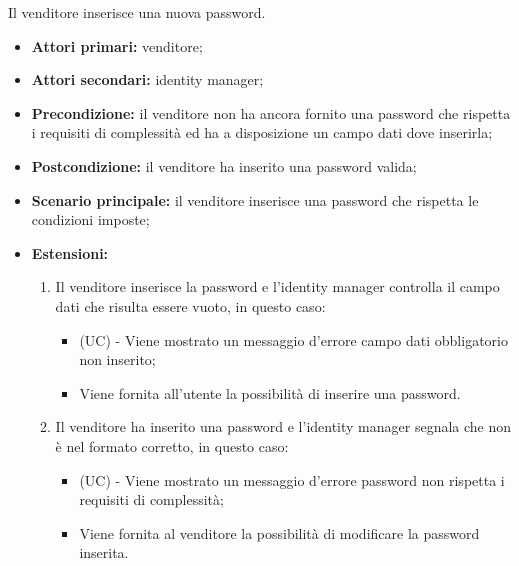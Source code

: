 Il venditore inserisce una nuova password.
\begin{itemize}
	\item \textbf{Attori primari:} venditore;
	\item \textbf{Attori secondari:} identity manager;
	\item \textbf{Precondizione:} il venditore non ha ancora fornito una password che rispetta i requisiti di complessità ed ha a disposizione un campo dati dove inserirla;
	\item \textbf{Postcondizione:} il venditore ha inserito una password valida;
	\item \textbf{Scenario principale:} il venditore inserisce una password che rispetta le condizioni imposte;
	\item \textbf{Estensioni:}
	\begin{enumerate}[label=\lett]
		\item Il venditore inserisce la password e l'identity manager controlla il campo dati che risulta essere vuoto, in questo caso:
		\begin{itemize}
			\item (UC) - Viene mostrato un messaggio d'errore campo dati obbligatorio non inserito;
			\item Viene fornita all'utente la possibilità di inserire una password.
		\end{itemize}
		\item Il venditore ha inserito una password e l'identity manager segnala che non è nel formato corretto, in questo caso:
		\begin{itemize}
			\item (UC) - Viene mostrato un messaggio d'errore password non rispetta i requisiti di complessità;
			\item Viene fornita al venditore la possibilità di modificare la password inserita.
		\end{itemize}
	\end{enumerate} 
\end{itemize}

